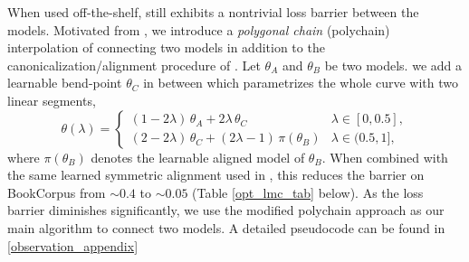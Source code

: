 \documentclass{article}
\begin{document}
When used off-the-shelf, \cite{theus2025generalizedlinearmodeconnectivity} still exhibits a nontrivial loss barrier between the models. Motivated from \citep{garipov2018losssurfacesmodeconnectivity}, we introduce a \emph{polygonal chain} (polychain) interpolation of connecting two models in addition to the canonicalization/alignment procedure of \citep{theus2025generalizedlinearmodeconnectivity}. Let $\theta_A$ and $\theta_B$ be two models. we add a learnable bend-point $\theta_C$ in between which parametrizes the whole curve with two linear segments, 
\begin{equation}\label{eq:polychain}
    \theta(\lambda) = \begin{cases} (1-2\lambda)\,\theta_A + 2\lambda\,\theta_C & \lambda \in [0, 0.5], \\ (2-2\lambda)\,\theta_C + (2\lambda-1)\,\pi(\theta_B) & \lambda \in (0.5, 1], \end{cases}
\end{equation}
where $\pi(\theta_B)$ denotes the learnable aligned model of $\theta_B$. When combined with the same learned symmetric alignment used in \citep{theus2025generalizedlinearmodeconnectivity}, this reduces the barrier on BookCorpus from ${\sim}0.4$ \citep[Table 2]{theus2025generalizedlinearmodeconnectivity} to ${\sim}0.05$ (Table \ref{opt_lmc_tab} below). As the loss barrier diminishes significantly, we use the modified polychain approach as our main algorithm to connect two models. A detailed pseudocode can be found in \cref{observation_appendix}
\begin{table}[ht!]  
\caption{Same-optimizer connectivity loss barrier. We report the validation loss barrier $\max_{\lambda \in [0,1]} \bigl[\mathcal{L}_{\mathrm{val}}(\theta(\lambda)) - \bigl((1{-}\lambda)\mathcal{L}_{\mathrm{val}}(\theta_A) + \lambda\mathcal{L}_{\mathrm{val}}(\theta_B)\bigr)\bigr]$, i.e., the maximum validation loss deviation of the interpolation path above the linear interpolation of endpoint losses. Compared to \citep{theus2025generalizedlinearmodeconnectivity},  the introduction
of polychain path significantly reduces loss barriers in all cases.}
\centering
\setlength{\abovecaptionskip}{10pt}
\label{opt_lmc_tab}
\end{table} 
\end{document}
